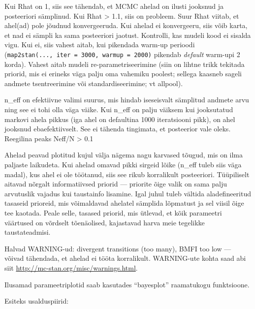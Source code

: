 \documentclass[]{book}
\newenvironment{Shaded}{\begin{snugshade}}{\end{snugshade}}
\newcommand{\KeywordTok}[1]{\textcolor[rgb]{0.13,0.29,0.53}{\textbf{#1}}}
\newcommand{\DataTypeTok}[1]{\textcolor[rgb]{0.13,0.29,0.53}{#1}}
\newcommand{\DecValTok}[1]{\textcolor[rgb]{0.00,0.00,0.81}{#1}}
\newcommand{\FloatTok}[1]{\textcolor[rgb]{0.00,0.00,0.81}{#1}}
\newcommand{\StringTok}[1]{\textcolor[rgb]{0.31,0.60,0.02}{#1}}
\newcommand{\CommentTok}[1]{\textcolor[rgb]{0.56,0.35,0.01}{\textit{#1}}}
\newcommand{\OperatorTok}[1]{\textcolor[rgb]{0.81,0.36,0.00}{\textbf{#1}}}
\newcommand{\NormalTok}[1]{#1}
\begin{document}
Kui Rhat on 1, siis see tähendab, et MCMC ahelad on ilusti jooksnud ja
posteeriori sämplinud. Kui Rhat \textgreater{} 1.1, siis on probleem.
Suur Rhat viitab, et ahel(ad) pole jõudnud konvergeeruda. Kui ahelad ei
konvergeeru, siis võib karta, et nad ei sämpli ka sama posteeriori
jaotust. Kontrolli, kas mudeli kood ei sisalda vigu. Kui ei, siis vahest
aitab, kui pikendada warm-up perioodi
(\texttt{map2stan(...,\ iter\ =\ 3000,\ warmup\ =\ 2000)} pikendab
\emph{default} warm-upi 2 korda). Vahest aitab mudeli
re-parametriseerimine (siin on lihtne trikk tekitada priorid, mis ei
erineks väga palju oma vahemiku poolest; sellega kaasneb sageli andmete
tsentreerimine või standardiseerimine; vt allpool).

n\_eff on efektiivne valimi suurus, mis hindab iseseisvalt sämplitud
andmete arvu ning see ei tohi olla väga väike. Kui n\_eff on palju
väiksem kui jooksutatud markovi ahela pikkus (iga ahel on defaultina
1000 iteratsiooni pikk), on ahel jooksnud ebaefektiivselt. See ei
tähenda tingimata, et posteerior vale oleks. Reegilina peaks Neff/N
\textgreater{} 0.1

Ahelad peavad plotitud kujul välja nägema nagu karvased tõugud, mis on
ilma paljaste laikudeta. Kui ahelad omavad pikki sirgeid lõike (n\_eff
tuleb siis väga madal), kus ahel ei ole töötanud, siis see rikub
korralikult posteeriori. Tüüpiliselt aitavad nõrgalt informatiivsed
priorid --- priorite õige valik on sama palju arvutuslik vajadus kui
taustainfo lisamine. Igal juhul tuleb vältida aladefineeritud tasaseid
prioreid, mis võimaldavad ahelatel sämplida lõpmatust ja sel viisil õige
tee kaotada. Peale selle, tasased priorid, mis ütlevad, et kõik
parameetri väärtused on võrdselt tõenäolised, kajastavad harva meie
tegelikke taustateadmisi.

Halvad WARNING-ud: divergent transitions (too many), BMFI too low ---
võivad tähendada, et ahelad ei tööta korralikult. WARNING-ute kohta saad
abi siit \url{http://mc-stan.org/misc/warnings.html}.

Ilusamad parameetriplotid saab kasutades ``bayesplot'' raamatukogu
funktsioone.

Esiteks usalduspiirid:



\begin{Shaded}
\end{Shaded}
\end{document}
